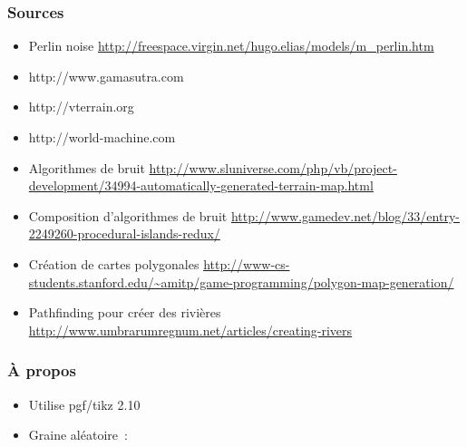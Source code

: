 \documentclass[hyperref={pdfpagelabels=false}]{beamer}
\begin{document}
\begin{frame}
  \frametitle{Sources}
  \begin{itemize}
  \item Perlin noise {\tiny \url{http://freespace.virgin.net/hugo.elias/models/m_perlin.htm}}
  \item http://www.gamasutra.com
  \item http://vterrain.org
  \item http://world-machine.com
  \item Algorithmes de bruit {\tiny \url{http://www.sluniverse.com/php/vb/project-development/34994-automatically-generated-terrain-map.html}}
  \item Composition d'algorithmes de bruit {\tiny \url{http://www.gamedev.net/blog/33/entry-2249260-procedural-islands-redux/}}
  \item Création de cartes polygonales {\tiny \url{http://www-cs-students.stanford.edu/~amitp/game-programming/polygon-map-generation/}}
  \item Pathfinding pour créer des rivières {\tiny \url{http://www.umbrarumregnum.net/articles/creating-rivers}}
  \end{itemize}
\end{frame}

\begin{frame}
  \frametitle{À propos}
  \begin{itemize}
  \item Utilise pgf/tikz 2.10%
  \item Graine aléatoire~: \noiseseed
  \end{itemize}
\end{frame}
\end{document}
